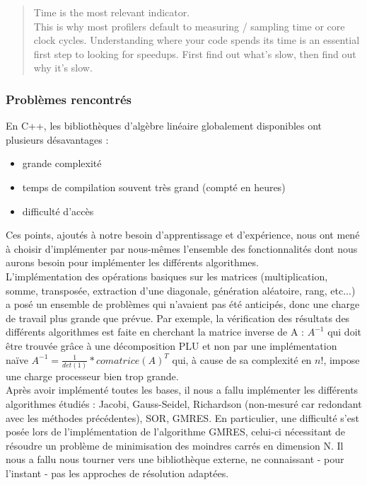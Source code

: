 \begin{quote}
	Time is the most relevant indicator.\\
	This is why most profilers default to measuring / sampling time or core clock cycles. Understanding where your code spends its time is an essential first step to looking for speedups. First find out what's slow, then find out why it's slow.
\end{quote}


\subsubsection{Problèmes rencontrés}
En C++, les bibliothèques d'algèbre linéaire globalement disponibles ont plusieurs désavantages :
\begin{itemize}
	\item grande complexité
	\item temps de compilation souvent très grand (compté en heures)
	\item difficulté d'accès
\end{itemize}

Ces points, ajoutés à notre besoin d'apprentissage et d'expérience, nous ont mené à choisir d'implémenter par nous-mêmes l'ensemble des fonctionnalités dont nous aurons besoin pour implémenter les différents algorithmes.\\

L'implémentation des opérations basiques sur les matrices (multiplication, somme, transposée, extraction d'une diagonale, génération aléatoire, rang, etc...) a posé un ensemble de problèmes qui n'avaient pas été anticipés, donc une charge de travail plus grande que prévue. Par exemple, la vérification des résultats des différents algorithmes est faite en cherchant la matrice inverse de A : $A^{-1}$ qui doit être trouvée grâce à une décomposition PLU et non par une implémentation naïve $A^{-1} = \frac{1}{det(1)} * comatrice(A)^{T}$ qui, à cause de sa complexité en $n!$, impose une charge processeur bien trop grande. \\

Après avoir implémenté toutes les bases, il nous a fallu implémenter les différents algorithmes étudiés : Jacobi, Gauss-Seidel, Richardson (non-mesuré car redondant avec les méthodes précédentes), SOR, GMRES. En particulier, une difficulté s'est posée lors de l'implémentation de l'algorithme GMRES, celui-ci nécessitant de résoudre un problème de minimisation des moindres carrés en dimension N. Il nous a fallu nous tourner vers une bibliothèque externe, ne connaissant - pour l'instant - pas les approches de résolution adaptées.


